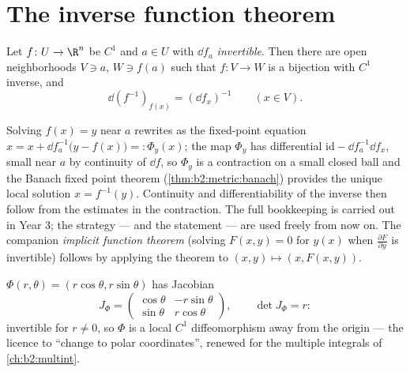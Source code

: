 \section{The inverse function theorem}

\begin{theorem}\label{thm:b2:diffcalc:inverse}
Let $f \colon U \to \R^n$ be $C^1$ and $a \in U$ with $\dd f_a$
\emph{invertible}. Then there are open neighborhoods $V \ni a$, $W
\ni f(a)$ such that $f \colon V \to W$ is a bijection with $C^1$
inverse, and
\[
\dd (f^{-1})_{f(x)} = (\dd f_x)^{-1} \qquad (x \in V).
\]
\end{theorem}
\admitted

\begin{remark}
Solving $f(x) = y$ near $a$ rewrites as the fixed-point equation
$x = x + \dd f_a^{-1}\bigl(y - f(x)\bigr) =: \Phi_y(x)$; the map
$\Phi_y$ has differential $\mathrm{id} - \dd f_a^{-1}\dd f_x$,
small near $a$ by continuity of $\dd f$, so $\Phi_y$ is a
contraction on a small closed ball and the Banach fixed point
theorem (\cref{thm:b2:metric:banach}) provides the unique local
solution $x = f^{-1}(y)$. Continuity and differentiability of the
inverse then follow from the estimates in the contraction. The full
bookkeeping is carried out in Year 3; the strategy --- and the
statement --- are used freely from now on. The companion
\emph{implicit function theorem} (solving $F(x, y) = 0$ for $y(x)$
when $\frac{\partial F}{\partial y}$ is invertible) follows by
applying the theorem to $(x, y) \mapsto (x, F(x,y))$.
\end{remark}

\begin{example}\label{ex:b2:diffcalc:polar}
$\Phi(r, \theta) = (r\cos\theta, r\sin\theta)$ has Jacobian
\[
J_\Phi = \begin{pmatrix} \cos\theta & -r\sin\theta\\ \sin\theta &
r\cos\theta \end{pmatrix},
\qquad \det J_\Phi = r :
\]
invertible for $r \neq 0$, so $\Phi$ is a local $C^1$
diffeomorphism away from the origin --- the licence to ``change to
polar coordinates'', renewed for the multiple integrals of
\cref{ch:b2:multint}.
\end{example}

